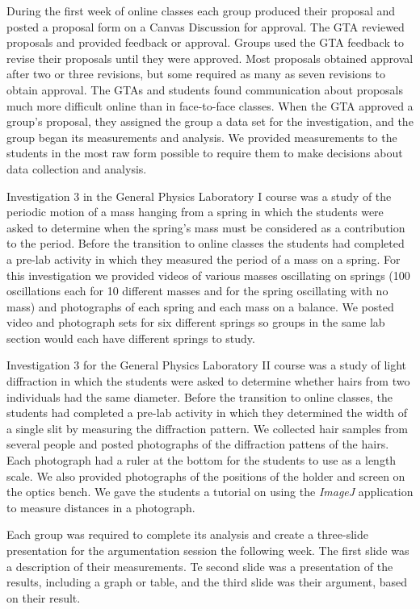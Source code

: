 \documentclass[aip, numerical, preprint]{revtex4-2}
\begin{document}
During the first week of online classes each group produced their proposal and posted a
proposal form on a Canvas Discussion for approval. The GTA reviewed proposals and provided
feedback or approval. Groups used the GTA feedback to revise their proposals until they were
approved. Most proposals obtained approval after two or three revisions, but some required as
many as seven revisions to obtain approval. The GTAs and students found communication about
proposals much more difficult online than in face-to-face classes. When the GTA approved a
group's proposal, they assigned the group a data set for the investigation, and the group began
its measurements and analysis. We provided measurements to the students in the most raw form
possible to require them to make decisions about data collection and analysis.

Investigation 3 in the General Physics Laboratory I course was a study of the periodic motion
of a mass hanging from a spring in which the students were asked to determine when the spring's
mass must be considered as a contribution to the period. Before the transition to online
classes the students had completed a pre-lab activity in which they measured the period of a
mass on a spring. For this investigation we provided videos of various masses oscillating on
springs (100 oscillations each for 10 different masses and for the spring oscillating with no
mass) and photographs of each spring and each mass on a balance. We posted video and photograph
sets for six different springs so groups in the same lab section would each have different
springs to study.

Investigation 3 for the General Physics Laboratory II course was a study of light diffraction
in which the students were asked to determine whether hairs from two individuals had the same
diameter. Before the transition to online classes, the students had completed a pre-lab
activity in which they determined the width of a single slit by measuring the diffraction
pattern. We collected hair samples from several people and posted photographs of the
diffraction pattens of the hairs. Each photograph had a ruler at the bottom for the students to
use as a length scale. We also provided photographs of the positions of the holder and screen
on the optics bench. We gave the students a tutorial on using the \emph{ImageJ}
application\citep{schrasetal12} to measure distances in a photograph.

Each group was required to complete its analysis and create a three-slide presentation for the
argumentation session the following week. The first slide was a description of their
measurements. Te second slide was a presentation of the results, including a graph or table,
and the third slide was their argument, based on their result.
\end{document}
